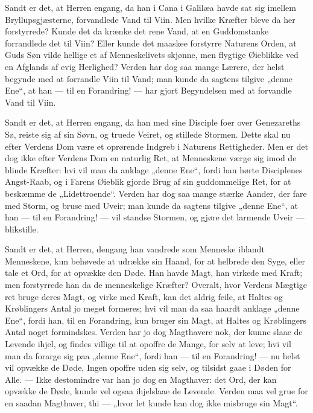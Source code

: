 \documentclass[12pt,a4paper]{book}
\begin{document}
Sandt er det, at Herren engang, da han i Cana i Galilæa havde sat sig imellem
Bryllupsgjæsterne, forvandlede Vand til Viin. Men hvilke Kræfter bleve da her
forstyrrede? Kunde det da krænke det rene Vand, at en Guddomstanke forrandlede det til
Viin? Eller kunde det maaskee forstyrre Naturens Orden, at Guds Søn vilde hellige et af
Menneskelivets skjønne, men flygtige Øieblikke ved en Afglands af evig Herlighed?
Verden har dog saa mange Lærere, der helst begynde med at forrandle Viin til Vand; man
kunde da sagtens tilgive „denne Ene“, at han --- til en Forandring! --- har gjort
Begyndelsen med at forvandle Vand til Viin.

Sandt er det, at Herren engang, da han med sine Disciple foer over Genezareths Sø,
reiste sig af sin Søvn, og truede
Veiret, og stillede Stormen. Dette skal nu efter Verdens Dom være et oprørende Indgreb
i Naturens Rettigheder. Men er det dog ikke efter Verdens Dom en naturlig Ret, at
Menneskene værge sig imod de blinde Kræfter: hvi vil man da anklage „denne Ene“, fordi
han hørte Disciplenes Angst-Raab, og i Farens Øieblik gjorde Brug af sin guddommelige
Ret, for at beskæmme de „Lidettroende“. Verden har dog saa mange stærke Aander, der
fare med Storm, og bruse med Uveir; man kunde da sagtens tilgive „denne Ene“, at han
--- til en Forandring! --- vil standse Stormen, og gjøre det larmende Uveir ---
blikstille.

Sandt er det, at Herren, dengang han vandrede som Menneske iblandt Menneskene, kun
behøvede at udrække sin Haand, for at helbrede den Syge, eller tale et Ord, for at
opvække den Døde. Han havde Magt, han virkede med Kraft; men forstyrrede han da de
menneskelige Kræfter? Overalt, hvor Verdens Mægtige ret bruge deres Magt, og virke med
Kraft, kan det aldrig feile, at Haltes og Krøblingers Antal jo meget formeres; hvi vil
man da saa haardt anklage „denne Ene“, fordi han, til en Forandring, kun bruger sin
Magt, at Haltes og Krøblingers Antal noget formindskes. Verden har jo dog Magthavere
nok, der kunne slaae de Levende ihjel, og findes villige til at opoffre de Mange, for
selv at leve; hvi vil man da forarge sig paa „denne Ene“, fordi han --- til en
Forandring! --- nu helst vil opvække de Døde, Ingen opoffre uden sig selv, og tilsidst
gaae i Døden for Alle. --- Ikke destomindre var han jo dog en Magthaver: det Ord, der
kan opvække de Døde, kunde vel ogsaa ihjelslaae de Levende. Verden maa vel grue for en
saadan Magthaver, thi --- „hvor let kunde han dog ikke misbruge sin Magt“.
\end{document}
